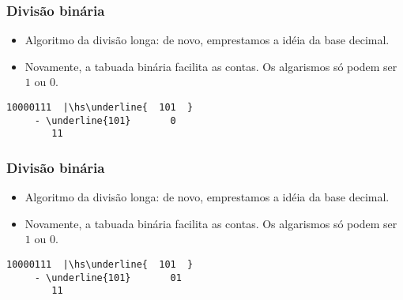 \documentclass{beamer}
\begin{document}
\begin{frame}[fragile]
\frametitle{Divisão binária}

\begin{itemize}
\item Algoritmo da divisão longa: de novo, emprestamos a idéia da base decimal.

\item Novamente, a tabuada binária facilita as contas. Os algarismos só podem ser $1$ ou $0$.
\end{itemize}

\def\hs{\hspace{-1mm}}

\begin{Verbatim}[commandchars=\\\{\},codes={\catcode`$=3\catcode`^=7}]
      10000111  |\hs\underline{  101  }
     - \underline{101}       0
        11
\end{Verbatim}

\end{frame}


\begin{frame}[fragile]
\frametitle{Divisão binária}

\begin{itemize}
\item Algoritmo da divisão longa: de novo, emprestamos a idéia da base decimal.

\item Novamente, a tabuada binária facilita as contas. Os algarismos só podem ser $1$ ou $0$.
\end{itemize}

\def\hs{\hspace{-1mm}}

\begin{Verbatim}[commandchars=\\\{\},codes={\catcode`$=3\catcode`^=7}]
      10000111  |\hs\underline{  101  }
     - \underline{101}       01
        11
\end{Verbatim}

\end{frame}

\end{document}
